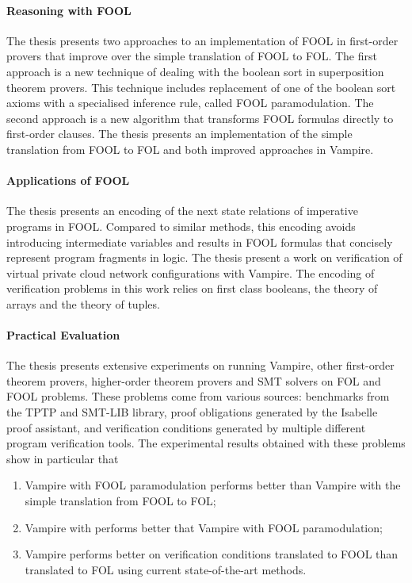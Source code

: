 \paragraph{Reasoning with FOOL}
The thesis presents two approaches to an implementation of FOOL in first-order provers that improve over the simple translation of FOOL to FOL. The first approach is a new technique of dealing with the boolean sort in superposition theorem provers. This technique includes replacement of one of the boolean sort axioms with a specialised inference rule, called FOOL paramodulation. The second approach is a new algorithm \nfcnf{} that transforms FOOL formulas directly to first-order clauses. The thesis presents an implementation of the simple translation from FOOL to FOL and both improved approaches in Vampire.

\paragraph{Applications of FOOL}
The thesis presents an encoding of the next state relations of imperative programs in FOOL. Compared to similar methods, this encoding avoids introducing intermediate variables and results in FOOL formulas that concisely represent program fragments in logic.
The thesis present a work on verification of virtual private cloud network configurations with Vampire. The encoding of verification problems in this work relies on first class booleans, the theory of arrays and the theory of tuples.

\paragraph{Practical Evaluation}
The thesis presents extensive experiments on running Vampire, other first-order theorem provers, higher-order theorem provers and SMT solvers on FOL and FOOL problems. These problems come from various sources: benchmarks from the TPTP and SMT-LIB library, proof obligations generated by the Isabelle proof assistant, and verification conditions generated by multiple different program verification tools. The experimental results obtained with these problems show in particular that \begin{enumerate}
  \item Vampire with FOOL paramodulation performs better than Vampire with the simple translation from FOOL to FOL;
  \item Vampire with \nfcnf{} performs better that Vampire with FOOL paramodulation;
  \item Vampire performs better on verification conditions translated to FOOL than translated to FOL using current state-of-the-art methods.
\end{enumerate}

